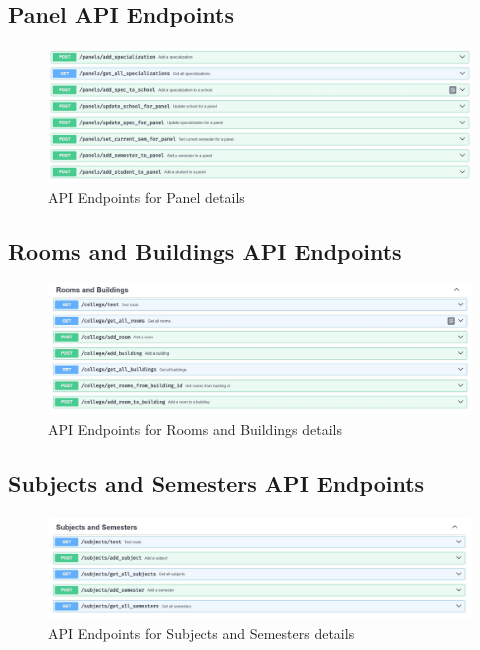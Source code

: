 \documentclass[openany]{report}
\begin{document}
\subsection{Panel API Endpoints}
\begin{figure}[H]
    \centering
    \includegraphics[width=.99\textwidth]{../imgs/swagger 4.jpg}
    \caption{API Endpoints for Panel details}
\end{figure}


\subsection{Rooms and Buildings API Endpoints}
\begin{figure}[H]
    \centering
    \includegraphics[width=.99\textwidth]{../imgs/swagger 5.jpg}
    \caption{API Endpoints for Rooms and Buildings details}
\end{figure}


\subsection{Subjects and Semesters API Endpoints}
\begin{figure}[H]
    \centering
    \includegraphics[width=.99\textwidth]{../imgs/swagger 6.jpg}
    \caption{API Endpoints for Subjects and Semesters details}
\end{figure}
\end{document}
